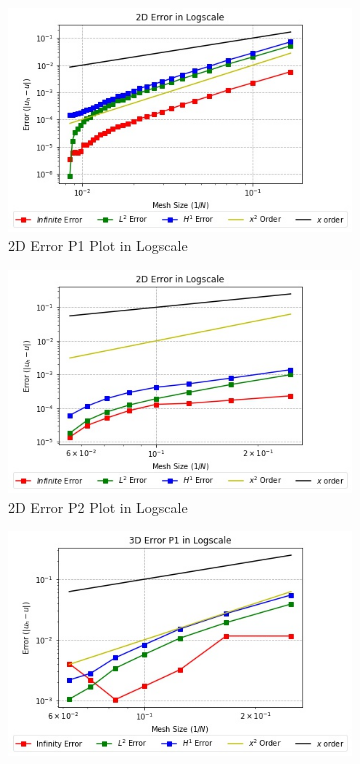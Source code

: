 \documentclass[a4paper,11pt]{article}
\begin{document}
\begin{figure}[h!]
	\begin{subfigure}[b]{0.5\linewidth}
		\centering
		\includegraphics[width=\linewidth]{picture/conference/all2derrorP1}
		\caption{2D Error P1 Plot in Logscale}
		\label{fig:2derrorP1}
	\end{subfigure}
	\quad
	\begin{subfigure}[b]{0.5\linewidth}
		\centering
		\includegraphics[width=\linewidth]{picture/conference/all2derrorP2}
		\caption{2D Error P2 Plot in Logscale}
		\label{fig:2derrorP2}
	\end{subfigure}
	\begin{subfigure}[b]{0.5\linewidth}
		\centering
		\includegraphics[width=\linewidth]{picture/conference/all3derrorP1}

\end{subfigure}
\end{figure}
\end{document}
